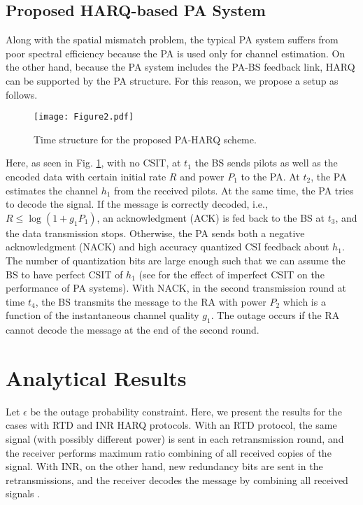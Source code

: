 \subsection{Proposed HARQ-based PA System}
Along with the spatial mismatch problem, the typical PA system suffers from poor spectral efficiency because the PA is used only for channel estimation. On the other hand, because the PA system includes the PA-BS feedback link,  HARQ can be supported by the PA structure. For this reason, we propose a setup as follows.

\begin{figure}
\centering
  \texttt{[image: Figure2.pdf]}\\
\caption{Time structure for the proposed PA-HARQ scheme.}\label{fig_timeslot}
\end{figure}

Here, as  seen in Fig. \ref{fig_timeslot}, with no CSIT, at $t_1$ the BS sends pilots as well as the encoded data with certain initial rate $R$ and power $P_1$ to the PA. At $t_2$, the PA estimates the channel $h_1$ from the received pilots. At the same time, the PA tries to decode the signal. If the message is correctly decoded, i.e., $R\leq \log(1+g_1P_1)$,  an acknowledgment (ACK) is fed back to the BS at $t_3$, and the data transmission stops. Otherwise, the PA sends both a negative acknowledgment (NACK) and high accuracy quantized CSI feedback about $h_1$. The number of quantization bits are large enough such that we can assume the BS to have perfect CSIT of $h_1$ (see \cite{guo2020semilinear} for the effect of imperfect CSIT on the performance of PA systems). With NACK, in the second transmission round at time $t_4$, the BS  transmits the message to the RA with power $P_2$  which is a function of the instantaneous channel quality $g_1$. The outage occurs if the RA cannot decode the message at the end of the second round. 

\section{Analytical Results}
Let $\epsilon$ be the outage probability constraint. Here, we present the results for the cases with RTD and INR HARQ protocols. With an RTD protocol, the same signal (with possibly different power) is sent in each retransmission round, and the receiver performs maximum ratio combining of all received copies of the signal. With INR, on the other hand, new redundancy bits are sent in the retransmissions, and the receiver decodes the message by combining all received signals \cite{makki2014green,chaitanya2011outage,djonin2008joint}.

